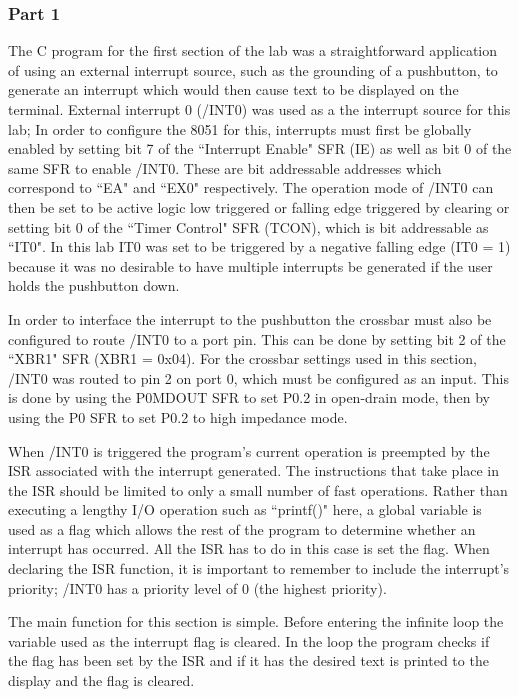 \documentclass[12pt]{article}
\begin{document}
\subsubsection{Part 1}
The C program for the first section of the lab was a straightforward application of using an external interrupt source, such as the grounding of a pushbutton, to generate an interrupt which would then cause text to be displayed on the terminal. External interrupt 0 (/INT0) was used as a the interrupt source for this lab; In order to configure the 8051 for this, interrupts must first be globally enabled by setting bit 7 of the ``Interrupt Enable" SFR (IE) as well as bit 0 of the same SFR to enable /INT0. These are bit addressable addresses which correspond to ``EA" and ``EX0" respectively. The operation mode of /INT0 can then be set to be active logic low triggered or falling edge triggered by clearing or setting bit 0 of the ``Timer Control" SFR (TCON), which is bit addressable as ``IT0". In this lab IT0 was set to be triggered by a negative falling edge (IT0 = 1) because it was no desirable to have multiple interrupts be generated if the user holds the pushbutton down. 

In order to interface the interrupt to the pushbutton the crossbar must also be configured to route /INT0 to a port pin. This can be done by setting bit 2 of the ``XBR1" SFR (XBR1 = 0x04). For the crossbar settings used in this section, /INT0 was routed to pin 2 on port 0, which must be configured as an input. This is done by using the P0MDOUT SFR to set P0.2 in open-drain mode, then by using the P0 SFR to set P0.2 to high impedance mode.  

When /INT0 is triggered the program's current operation is preempted by the ISR associated with the interrupt generated. The instructions that take place in the ISR should be limited to only a small number of fast operations. Rather than executing a lengthy I/O operation such as ``printf()" here, a global variable is used as a flag which allows the rest of the program to determine whether an interrupt has occurred. All the ISR has to do in this case is set the flag. When declaring the ISR function, it is important to remember to include the interrupt's priority; /INT0 has a priority level of 0 (the highest priority).

The main function for this section is simple. Before entering the infinite loop the variable used as the interrupt flag is cleared. In the loop the program checks if the flag has been set by the ISR and if it has the desired text is printed to the display and the flag is cleared.
\end{document}
